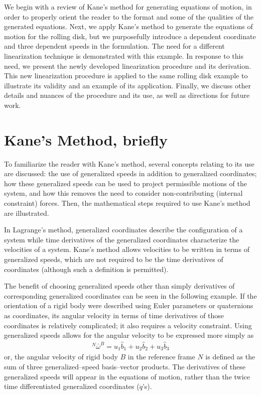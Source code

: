 \documentclass[smallcondensed,final]{svjour3}                     %
\begin{document}
We begin with a review of Kane's method for generating equations of motion, in
order to properly orient the reader to the format and some of the qualities of
the generated equations. Next, we apply Kane's method to generate the equations
of motion for the rolling disk, but we purposefully introduce a dependent
coordinate and three dependent speeds in the formulation.  The need for a
different linearization technique is demonstrated with this example. In
response to this need, we present the newly developed linearization procedure
and its derivation. This new linearization procedure is applied to the same
rolling disk example to illustrate its validity and an example of its
application. Finally, we discuss other details and nuances of the procedure and
its use, as well as directions for future work.

\section{Kane's Method, briefly}
\label{sec:kane_method}
To familiarize the reader with Kane's method, several concepts relating to its
use are discussed: the use of generalized speeds in addition to generalized
coordinates; how these generalized speeds can be used to project permissible
motions of the system, and how this removes the need to consider
non-contributing (internal constraint) forces.  Then, the mathematical steps
required to use Kane's method are illustrated.

In Lagrange's method, generalized coordinates describe the configuration of a
system while time derivatives of the generalized coordinates characterize the
velocities of a system.  Kane's method allows velocities to be written in terms
of generalized speeds, which are not required to be the time derivatives of
coordinates (although such a definition is permitted).

The benefit of choosing generalized speeds other than simply derivatives of
corresponding generalized coordinates can be seen in the following example. If
the orientation of a rigid body were described using Euler parameters or
quaternions as coordinates, its angular velocity in terms of time derivatives
of those coordinates is relatively complicated; it also requires a velocity
constraint. Using generalized speeds allows for the angular velocity to be
expressed more simply as
\begin{align}
\label{eq:ex1}
{^N}\bar{\omega}^B = u_1 \hat{b}_1 + u_2 \hat{b}_2 + u_3 \hat{b}_3
\end{align}
or, the angular velocity of rigid body $B$ in the reference frame $N$ is
defined as the sum of three generalized--speed basis--vector products.
The derivatives of these generalized speeds will appear in the equations
of motion, rather than the twice time differentiated generalized coordinates
($\ddot{q}$'s).
\end{document}
